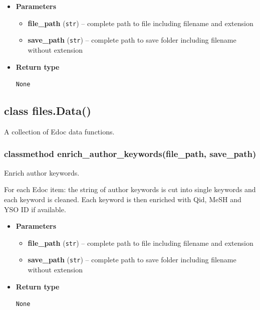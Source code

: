 \begin{itemize}
\item
  \textbf{Parameters}

  \begin{itemize}
  \item
    \textbf{file\_path} (\texttt{str}) -- complete path to file
    including filename and extension
  \item
    \textbf{save\_path} (\texttt{str}) -- complete path to save folder
    including filename without extension
  \end{itemize}
\item
  \textbf{Return type}

  \texttt{None}
\end{itemize}

\hypertarget{class-files.data}{%
\subsection{class files.Data()}\label{class-files.data}}

A collection of Edoc data functions.

\hypertarget{classmethod-enrich_author_keywordsfile_path-save_path}{%
\subsubsection{classmethod enrich\_author\_keywords(file\_path,
save\_path)}\label{classmethod-enrich_author_keywordsfile_path-save_path}}

Enrich author keywords.

For each Edoc item: the string of author keywords is cut into single
keywords and each keyword is cleaned. Each keyword is then enriched with
Qid, MeSH and YSO ID if available.

\begin{itemize}
\item
  \textbf{Parameters}

  \begin{itemize}
  \item
    \textbf{file\_path} (\texttt{str}) -- complete path to file
    including filename and extension
  \item
    \textbf{save\_path} (\texttt{str}) -- complete path to save folder
    including filename without extension
  \end{itemize}
\item
  \textbf{Return type}

  \texttt{None}
\end{itemize}

